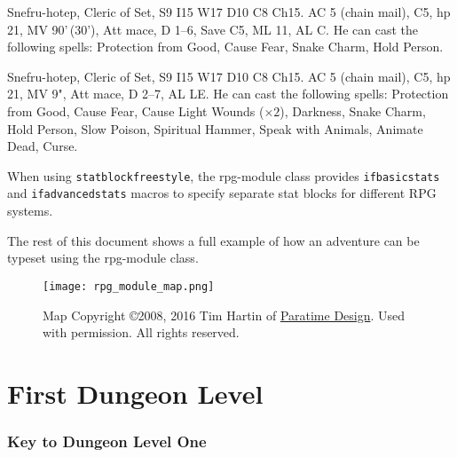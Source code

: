 \documentclass[a4paper,serif]{rpg-module}
\begin{document}

\begin{statblockfreestyle}
\begin{ifbasicstats}
Snefru-hotep, Cleric of Set, S9 I15 W17 D10 C8 Ch15. AC 5 (chain mail), C5, hp 21, MV 90'\,(30'), Att mace, D 1--6, Save C5, ML 11, AL C.
He can cast the following spells: Protection from Good, Cause Fear, Snake Charm, Hold Person.
\end{ifbasicstats}
\begin{ifadvancedstats}
Snefru-hotep, Cleric of Set, S9 I15 W17 D10 C8 Ch15. AC 5 (chain mail), C5, hp 21, MV 9", Att mace, D 2--7, AL LE.
He can cast the following spells: Protection from Good, Cause Fear, Cause Light Wounds ($\times 2$), Darkness,
Snake Charm, Hold Person, Slow Poison, Spiritual Hammer, Speak with Animals, Animate Dead, Curse.
\end{ifadvancedstats}
\end{statblockfreestyle}

\noindent When using \verb|statblockfreestyle|, the rpg-module class provides \verb|ifbasicstats| and \verb|ifadvancedstats| macros to specify separate
stat blocks for different RPG systems.

The rest of this document shows a full example of how an adventure can be typeset using the rpg-module class.

\newpage



\begin{figure*}[p]
\centering
\texttt{[image: rpg\_module\_map.png]}
\vspace{5ex}
\caption*{Map Copyright \copyright 2008, 2016 Tim Hartin of
\href{http://paratime.ca}{Paratime Design}. Used with permission. All rights reserved.}
\label{img:map}
\end{figure*}

\part{First Dungeon Level}
\label{example_dungeon}

\section*{Key to Dungeon Level One}
\end{document}
